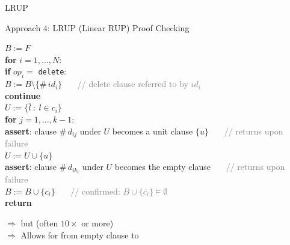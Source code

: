 \documentclass[t,english]{sdqbeamer}
\begin{document}
\begin{frame}{LRUP}
	\vspace*{-4mm}
	\begin{blueblock}{Approach 4: LRUP (Linear RUP) Proof Checking}
		\vspace*{2mm}\hspace*{0.5cm}\begin{minipage}{0.95\textwidth}
			$B := F$\\
			\textbf{for} $i=1,\ldots,N$:\\
			\hspace*{5mm} {\textbf{if} $op_i =$ \texttt{delete}:} \\
			\hspace*{10mm} {$B := B \setminus \{\#\,id_i\}$} \ \ \ \textcolor{gray}{// delete clause referred to by $id_i$} \\
			\hspace*{10mm} {\textbf{continue}} \\
			\hspace*{5mm} $U := \{ \overline{l}\ :\ l \in c_i \}$ \\
			\hspace*{5mm} \textbf{for} $j=1,\ldots,k-1$: \\
			\hspace*{10mm} \textbf{assert}: clause \#\,$d_{ij}$ under $U$ becomes a unit clause $\{u\}$ \ \ \ \textcolor{gray}{// returns \textbf{} upon failure} \\
			\hspace*{10mm} $U := U \cup \{u\}$ \\
			\hspace*{5mm} \textbf{assert}: clause \#\,$d_{ik_i}$ under $U$ becomes the empty clause \ \ \ \textcolor{gray}{// returns \textbf{} upon failure} \\
			\hspace*{5mm} $B := B \cup \{c_i\}$ \ \ \ \textcolor{gray}{// confirmed: $B \cup \{\overline{c_i}\} \models \emptyset$ } \\
			\textbf{return} \textbf{}
		\end{minipage}
	\end{blueblock}
	
	\pause
	\vspace*{1mm}
	$\Rightarrow$  but  (often $10\times$ or more)\\
	$\Rightarrow$ Allows for  from empty clause to 
\end{frame}
\end{document}
